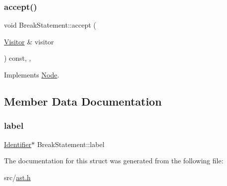 \subsubsection{\texorpdfstring{accept()}{accept()}}
{\footnotesize\ttfamily void Break\+Statement\+::accept (\begin{DoxyParamCaption}\item[{\hyperlink{struct_visitor}{Visitor} \&}]{visitor }\end{DoxyParamCaption}) const\hspace{0.3cm}{\ttfamily [inline]}, {\ttfamily [override]}, {\ttfamily [virtual]}}



Implements \hyperlink{struct_node_a10bd7af968140bbf5fa461298a969c71}{Node}.



\subsection{Member Data Documentation}
\mbox{\label{struct_break_statement_a42b738327adc45037878958ebb488113}} 
\subsubsection{\texorpdfstring{label}{label}}
{\footnotesize\ttfamily \hyperlink{struct_identifier}{Identifier}$\ast$ Break\+Statement\+::label}



The documentation for this struct was generated from the following file\+:\begin{DoxyCompactItemize}
\item 
src/\hyperlink{ast_8h}{ast.\+h}\end{DoxyCompactItemize}
